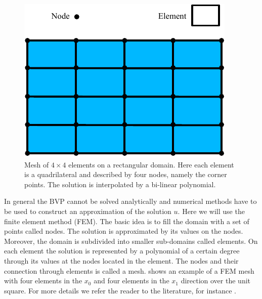 \begin{figure}[ht]
    \centerline{\includegraphics{figures/FirstStepMesh}}
    \caption{Mesh of $4 \times 4$ elements on a rectangular domain. Here
    each element is a quadrilateral and described by four nodes, namely
    the corner points. The solution is interpolated by a bi-linear
    polynomial.}
    \label{fig:FirstSteps.2}
\end{figure}

In general the BVP cannot be solved
analytically and numerical methods have to be used to construct an
approximation of the solution $u$.
Here we will use the finite element method
(FEM).
The basic idea is to fill the domain with a set of points called nodes.
The solution is approximated by its values on the nodes.
Moreover, the domain is subdivided into smaller sub-domains called
elements.
On each element the solution is represented by a polynomial of a certain
degree through its values at the nodes located in the element.
The nodes and their connection through elements is called a
mesh.  shows an
example of a FEM mesh with four elements in the $x_0$ and four elements
in the $x_1$ direction over the unit square.
For more details we refer the reader to the literature, for instance .

